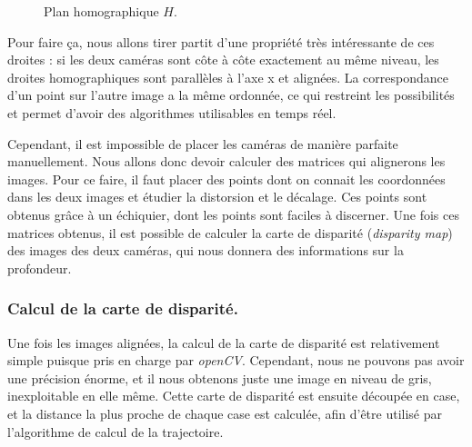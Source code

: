 \documentclass{article}
\begin{document}
\begin{figure}
    \begin{center}
    \end{center}
    \caption{Plan homographique $H$.}
    \label{homo}
\end{figure}

Pour faire ça, nous allons tirer partit d'une propriété très intéressante de ces droites : si les deux caméras sont côte à côte exactement au même niveau, les droites homographiques sont parallèles à l'axe x et alignées. La correspondance d'un point sur l'autre image a la même ordonnée, ce qui restreint les possibilités et permet d'avoir des algorithmes utilisables en temps réel.

Cependant, il est impossible de placer les caméras de manière parfaite manuellement. Nous allons donc devoir calculer des matrices qui alignerons les images. Pour ce faire, il faut placer des points dont on connait les coordonnées dans les deux images et étudier la distorsion et le décalage. Ces points sont obtenus grâce à un échiquier, dont les points sont faciles à discerner. Une fois ces matrices obtenus, il est possible de calculer la carte de disparité (\emph{disparity map}) des images des deux caméras, qui nous donnera des informations sur la profondeur.

\subsubsection{Calcul de la carte de disparité.}
Une fois les images alignées, la calcul de la carte de disparité est relativement simple puisque pris en charge par \emph{openCV}. Cependant, nous ne pouvons pas avoir une précision énorme, et il nous obtenons juste une image en niveau de gris, inexploitable en elle même. Cette carte de disparité est ensuite découpée en case, et la distance la plus proche de chaque case est calculée, afin d'être utilisé par l'algorithme de calcul de la trajectoire.
\end{document}
